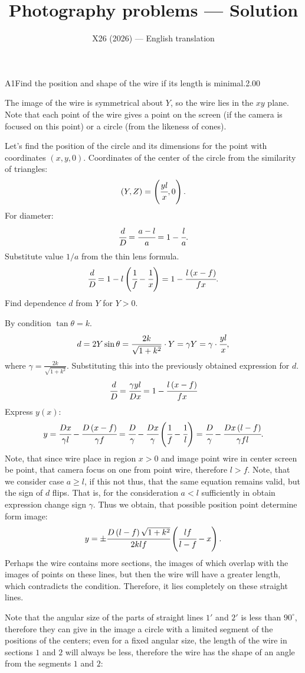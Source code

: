 \documentclass[11pt,a4paper]{article}
\title{\textbf{Photography problems --- Solution}}
\author{\normalsize X26 (2026) — English translation}
\date{}
\begin{document}
\maketitle\vspace{-0.5em}
\begin{solcard}{A1}{Find the position and shape of the wire if its length is minimal.}{2.00}

The image of the wire is symmetrical about $Y$, so the wire lies in the $xy$ plane. Note that each point of the wire gives a point on the screen (if the camera is focused on this point) or a circle (from the likeness of cones).


Let's find the position of the circle and its dimensions for the point with coordinates $(x,y,0)$. Coordinates of the center of the circle from the similarity of triangles: $$\left(Y,Z\right) = \left(\cfrac{yl}{x},0\right).$$For diameter: $$\cfrac{d}{D} = \cfrac{a-l}{a} = 1-\cfrac{l}{a}.$$Substitute value $1/a$ from the thin lens formula. $$\cfrac{d}{D} = 1-l\left(\cfrac{1}{f}-\cfrac{1}{x}\right) = 1 - \cfrac{l\left(x-f\right)}{fx}.$$Find dependence $d$ from $Y$ for $Y>0$.


By condition $\tan \theta = k$. $$d = 2Y\sin\theta = \frac{2k}{\sqrt{1+k^2}} \cdot Y = \gamma Y = \gamma \cdot \cfrac{yl}{x},$$where $\gamma = \frac{2k}{\sqrt{1+k^2}}$. Substituting this into the previously obtained expression for $d$. $$\cfrac{d}{D} = \cfrac{\gamma yl}{Dx} = 1 - \cfrac{l\left(x-f\right)}{fx}$$Express $y(x)$: $$y = \cfrac{Dx}{\gamma l} - \cfrac{D\left(x-f\right)}{\gamma f} = \cfrac{D}{\gamma} - \cfrac{Dx}{\gamma} \left(\cfrac{1}{f}-\cfrac{1}{l}\right) = \cfrac{D}{\gamma} - \cfrac{Dx\left(l-f\right)}{\gamma fl}.$$Note, that since wire place in region $x>0$ and image point wire in center screen be point, that camera focus on one from point wire, therefore $l > f$. Note, that we consider case $a\geqslant l$, if this not thus, that the same equation remains valid, but the sign of $d$ flips. That is, for the consideration $a < l$ sufficiently in obtain expression change sign $\gamma$. Thus we obtain, that possible position point determine form image: $$y = \pm\cfrac{D\left(l-f\right)\sqrt{1+k^2}}{2k lf} \left(\cfrac{lf}{l-f}-x\right).$$Perhaps the wire contains more sections, the images of which overlap with the images of points on these lines, but then the wire will have a greater length, which contradicts the condition. Therefore, it lies completely on these straight lines.


Note that the angular size of the parts of straight lines $1'$ and $2'$ is less than $90^\circ$, therefore they can give in the image a circle with a limited segment of the positions of the centers; even for a fixed angular size, the length of the wire in sections $1$ and $2$ will always be less, therefore the wire has the shape of an angle from the segments $1$ and $2$:


\end{solcard}
\end{document}
